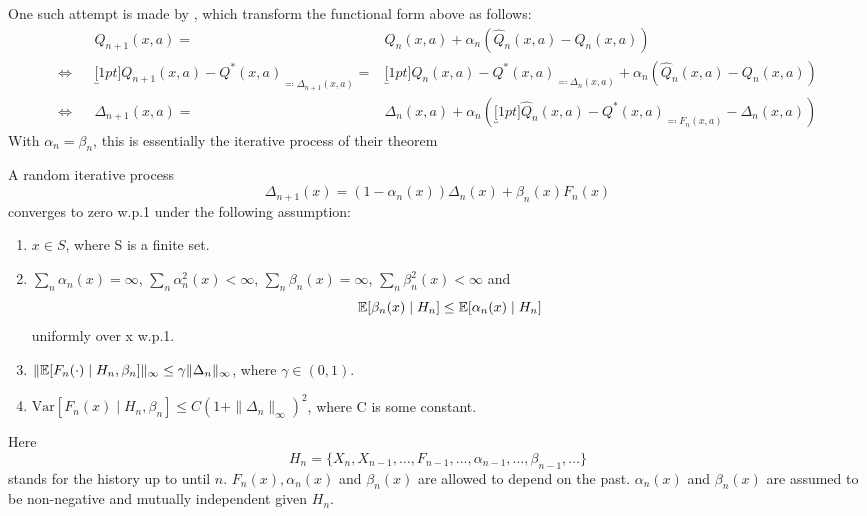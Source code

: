 One such attempt is made by \textcite{jaakkolaConvergenceStochasticIterative1994a}, which transform the functional form above as follows:
\begin{align*}
    &&Q_{n+1}(x,a)
    =&Q_n(x,a) + \alpha_n(\hat{Q}_n (x,a)-Q_n(x,a))
    \\
    \iff
    && \underbracket[1pt]{Q_{n+1}(x,a) -Q^*(x,a)}_{\eqqcolon\Delta_{n+1}(x,a)} 
    =&\underbracket[1pt]{Q_n(x,a)-Q^*(x,a) }_{\eqqcolon\Delta_n(x,a)}
    + \alpha_n(\hat{Q}_n (x,a)-Q_n(x,a))\\
    \iff&& \Delta_{n+1}(x,a) =&\Delta_n(x,a) +\alpha_n 
    (\underbracket[1pt]{\hat{Q}_n (x,a)-Q^*(x,a)}_{
        \eqqcolon F_n(x,a)
    }-\Delta_n(x,a))
\end{align*}
With \(\alpha_n=\beta_n\), this is essentially the iterative process of their theorem

\begin{thm}\label{JAAKKOLA:THM}
    A random iterative process
    \[
        \Delta_{n+1}(x)=(1-\alpha_n(x)) \Delta_n(x) +\beta_n(x) F_n(x)
    \]
    converges to zero w.p.1 under the following assumption:
    \begin{enumerate}
        \item\label{Jaakkola:1} \(x\in S\), where S is a finite set.
        \item\label{Jaakkola:2} \(\sum_n \alpha_n(x)=\infty\), \(\sum_n \alpha_n^2(x) <\infty\), \(\sum_n\beta_n(x)=\infty\), \(\sum_n \beta_n^2 (x)<\infty\) and
        \[
            \mathbb{E}[\beta_n(x)\mid H_n]\le \mathbb{E}[\alpha_n(x)\mid H_n]
        \]
        uniformly over x w.p.1.
        \item\label{Jaakkola:3} \(\|\mathbb{E}[F_n(\cdot)\mid H_n,\beta_n]\|_\infty \le \gamma \|\Delta_n\|_\infty\), where \(\gamma \in (0,1) \).
        \item\label{Jaakkola:4} \(\text{Var}[F_n(x)\mid H_n,\beta_n]\le C(1+\|\Delta_n\|_\infty)^2\), where C is some constant.
    \end{enumerate}
    Here
    \[
        H_n=\{X_n, X_{n-1}, \dots, F_{n-1}, \dots, \alpha_{n-1},\dots, \beta_{n-1},\dots\}
    \]
    stands for the history up to until \(n\). \(F_n(x), \alpha_n(x)\) and \(\beta_n(x)\) are allowed to depend on the past. \(\alpha_n(x)\) and \(\beta_n(x)\) are assumed to be non-negative and mutually independent given \(H_n\).
\end{thm}

